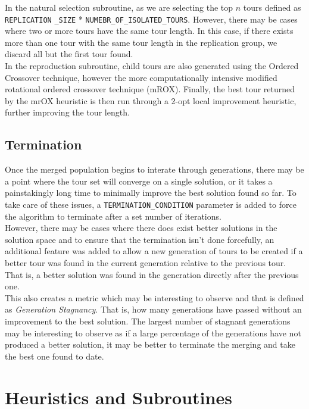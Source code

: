 \documentclass[12pt]{article}
\begin{document}
In the natural selection subroutine, as we are selecting the top $n$ tours defined as \verb|REPLICATION|
\verb|_SIZE| * \verb|NUMEBR_OF_ISOLATED_TOURS|. However, there may be cases where two or more tours have the same tour length. In this case, if there exists more than one tour with the same tour length in the replication group, we discard all but the first tour found.\\

In the reproduction subroutine, child tours are also generated using the Ordered Crossover technique, however the more computationally intensive modified rotational ordered crossover technique (mROX). Finally, the best tour returned by the mrOX heuristic is then run through a 2-opt local improvement heuristic, further improving the tour length. 

\subsection{Termination} 

Once the merged population begins to interate through generations, there may be a point where the tour set will converge on a single solution, or it takes a painstakingly long time to minimally improve the best solution found so far. To take care of these issues, a \verb|TERMINATION_CONDITION| parameter is added to force the algorithm to terminate after a set number of iterations.\\

However, there may be cases where there does exist better solutions in the solution space and to ensure that the termination isn't done forcefully, an additional feature was added to allow a new generation of tours to be created if a better tour was found in the current generation relative to the previous tour. That is, a better solution was found in the generation directly after the previous one.\\

This also creates a metric which may be interesting to observe and that is defined as \textit{Generation Stagnancy}. That is, how many generations have passed without an improvement to the best solution. The largest number of stagnant generations may be interesting to observe as if a large percentage of the generations have not produced a better solution, it may be better to terminate the merging and take the best one found to date.

\section{Heuristics and Subroutines}
\end{document}
